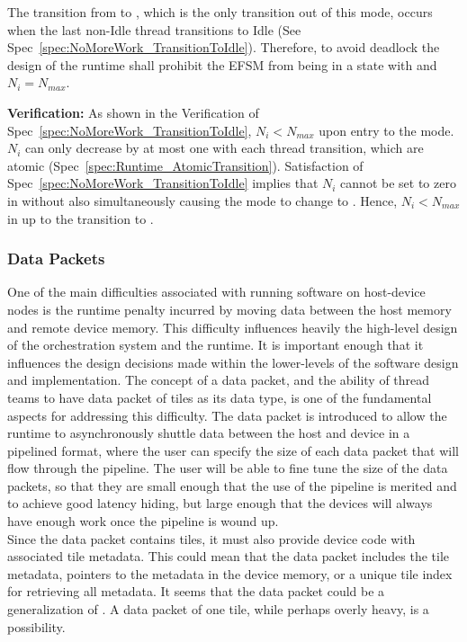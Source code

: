 \documentclass{article}
\begin{document}
\begin{spec}
\label{spec:NoMoreWork_NeedThread}
The transition from {\TeamRunningNoMoreWork} to \TeamIdle, which is the only
transition out of this mode, occurs when the last non-Idle thread transitions to
Idle (See Spec~\ref{spec:NoMoreWork_TransitionToIdle}).  Therefore, to avoid
deadlock the design of the runtime shall prohibit the EFSM from being in a state
with {\TeamRunningNoMoreWork} and $N_i = N_{max}$.
\end{spec}
\textbf{Verification:}\hspace{0.125in} As shown in the Verification of
Spec~\ref{spec:NoMoreWork_TransitionToIdle},  $N_i < N_{max}$ upon entry to the
mode. $N_i$ can only decrease by at most one with each thread transition,
which are atomic (Spec~\ref{spec:Runtime_AtomicTransition}). Satisfaction of
Spec~\ref{spec:NoMoreWork_TransitionToIdle} implies that $N_i$ cannot be set to
zero in {\TeamRunningNoMoreWork} without also simultaneously causing the mode to
change to \TeamIdle.  Hence, $N_i < N_{max}$ in {\TeamRunningNoMoreWork} up to
the transition to \TeamIdle.

\subsubsection{Data Packets}

One of the main difficulties associated with running software on host-device
nodes is the runtime penalty incurred by moving data between the host memory and
remote device memory.  This difficulty influences heavily the
high-level design of the orchestration system and the runtime.  It is
important enough that it influences the design decisions made within the
lower-levels of the software design and implementation.  The concept of a data
packet, and the ability of thread teams to have data packet of tiles as its data
type, is one of the fundamental aspects for addressing this difficulty.
The data packet is introduced to allow
the runtime to asynchronously shuttle data between the host and device in a
pipelined format, where the user can specify the size of each data packet that
will flow through the pipeline.  The user will be able to fine tune
the size of the data packets, so that they are small enough that the use of the
pipeline is merited and to achieve good latency hiding, but large enough that
the devices will always have enough work once the pipeline is wound up.\\

Since the data packet contains tiles, it must also provide device code with
associated tile metadata.  This could mean that the data packet includes
the tile metadata, pointers to the
metadata in the device memory, or a unique tile index for retrieving all
metadata.  It seems that the data packet could be a generalization of
.  A data packet of one tile, while perhaps overly
heavy, is a possibility.\\
\end{document}
